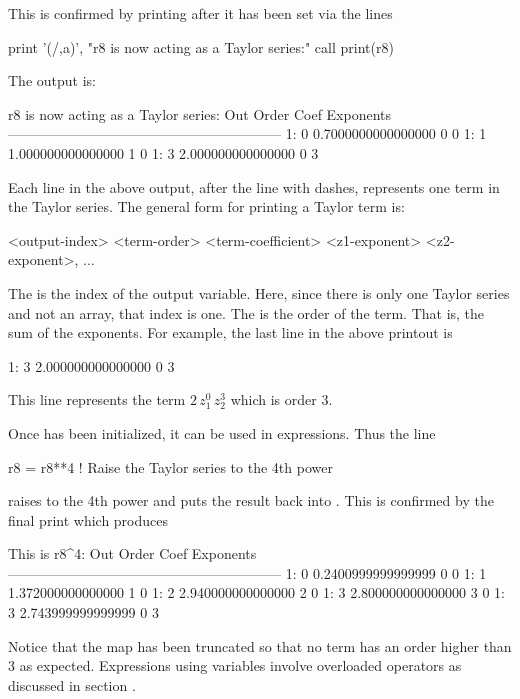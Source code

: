 \documentclass{hitec}     %
\begin{document}
This is confirmed by printing  after it has been set via the lines
\begin{example}
  print '(/,a)', "r8 is now acting as a Taylor series:"
  call print(r8)
\end{example}
The output is:
\begin{example}
r8 is now acting as a Taylor series:
Out  Order  Coef                     Exponents
-----------------------------------------------------------
  1:     0  0.7000000000000000       0  0
  1:     1   1.000000000000000       1  0
  1:     3   2.000000000000000       0  3
\end{example}
Each line in the above output, after the line with dashes, represents one term in the Taylor series. The general form for printing a Taylor term is:
\begin{example}
  <output-index> <term-order>   <term-coefficient>    <z1-exponent>  <z2-exponent>, ...
\end{example}
The  is the index of the output variable. Here, since there is only one Taylor
series and not an array, that index is one.  The  is the order of the term. That is, the
sum of the exponents. For example, the last line in the above printout is
\begin{example}
  1:     3   2.000000000000000       0  3
\end{example}
This line represents the term $2 \, z_1^0 \, z_2^3$ which is order 3. 

Once  has been initialized, it can be used in expressions. Thus the line
\begin{example}
  r8 = r8**4  ! Raise the Taylor series to the 4th power
\end{example}
raises  to the 4th power and puts the result back into . This is confirmed by the final print which produces
\begin{example}
This is r8^4:
Out  Order  Coef                     Exponents
-----------------------------------------------------------
  1:     0  0.2400999999999999       0  0
  1:     1   1.372000000000000       1  0
  1:     2   2.940000000000000       2  0
  1:     3   2.800000000000000       3  0
  1:     3   2.743999999999999       0  3
\end{example}
Notice that the map has been truncated so that no term has an order higher than 3 as expected. Expressions using  variables involve overloaded operators as discussed in section .

\end{document}
